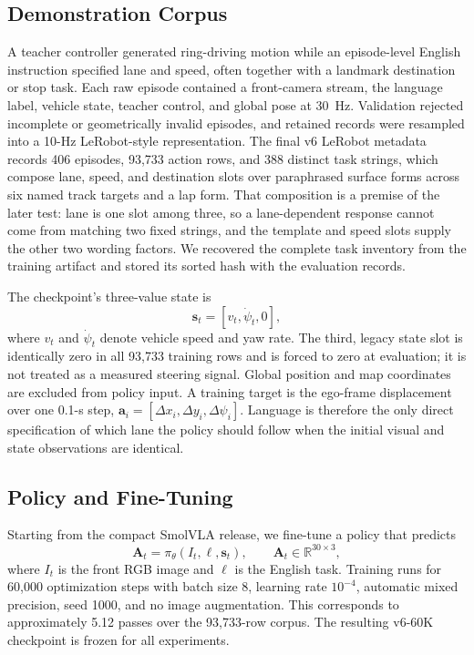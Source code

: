 \documentclass[letterpaper,conference]{IEEEtran}
\begin{document}
\subsection{Demonstration Corpus}
A teacher controller generated ring-driving motion while an episode-level
English instruction specified lane and speed, often together with a landmark
destination or stop task. Each
raw episode contained a front-camera stream, the language label, vehicle state,
teacher control, and global pose at 30~Hz. Validation rejected incomplete or
geometrically invalid episodes, and retained records were resampled into a
10-Hz LeRobot-style representation. The final v6 LeRobot metadata records 406
episodes, 93,733 action rows, and 388 distinct task strings, which compose lane,
speed, and destination slots over paraphrased surface forms across six named
track targets and a lap form. That composition is a premise of the later test:
lane is one slot among three, so a lane-dependent response cannot come from
matching two fixed strings, and the template and speed slots supply the other
two wording factors. We recovered the
complete task inventory from the training artifact and stored its sorted hash
with the evaluation records.

The checkpoint's three-value state is
\begin{equation}
\mathbf{s}_t=[v_t,\dot{\psi}_t,0],
\label{eq:state}
\end{equation}
where $v_t$ and $\dot{\psi}_t$ denote vehicle speed and yaw rate. The third,
legacy state slot is identically zero in all 93,733 training rows and is forced
to zero at evaluation; it is not treated as a measured steering signal. Global
position and map coordinates are excluded from policy input. A training target
is the ego-frame displacement over one 0.1-s step,
$\mathbf{a}_i=[\Delta x_i,\Delta y_i,\Delta\psi_i]$. Language is therefore the
only direct specification of which lane the policy should follow when the
initial visual and state observations are identical.

\subsection{Policy and Fine-Tuning}
Starting from the compact SmolVLA release, we fine-tune a policy that predicts
\begin{equation}
\mathbf{A}_t=\pi_\theta(I_t,\ell,\mathbf{s}_t),\qquad
\mathbf{A}_t\in\mathbb{R}^{30\times3},
\label{eq:policy}
\end{equation}
where $I_t$ is the front RGB image and $\ell$ is the English task. Training
runs for 60,000 optimization steps with batch size 8, learning rate $10^{-4}$,
automatic mixed precision, seed 1000, and no image augmentation. This
corresponds to approximately 5.12 passes over the 93,733-row corpus. The
resulting v6-60K checkpoint is frozen for all experiments.
\end{document}
